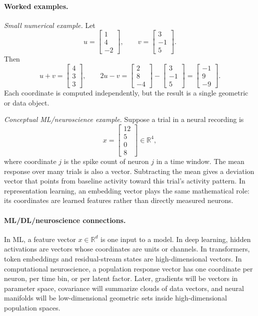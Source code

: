 \paragraph{Worked examples.}
\emph{Small numerical example.} Let
\[
u=\begin{bmatrix}1\\4\\-2\end{bmatrix},
\qquad
v=\begin{bmatrix}3\\-1\\5\end{bmatrix}.
\]
Then
\[
u+v=\begin{bmatrix}4\\3\\3\end{bmatrix},
\qquad
2u-v=
\begin{bmatrix}2\\8\\-4\end{bmatrix}
-
\begin{bmatrix}3\\-1\\5\end{bmatrix}
=
\begin{bmatrix}-1\\9\\-9\end{bmatrix}.
\]
Each coordinate is computed independently, but the result is a single geometric or data object.

\emph{Conceptual ML/neuroscience example.} Suppose a trial in a neural recording is
\[
x=\begin{bmatrix}12\\5\\0\\8\end{bmatrix}\in\mathbb{R}^4,
\]
where coordinate \(j\) is the spike count of neuron \(j\) in a time window. The mean response over many trials is also a vector. Subtracting the mean gives a deviation vector that points from baseline activity toward this trial's activity pattern. In representation learning, an embedding vector plays the same mathematical role: its coordinates are learned features rather than directly measured neurons.

\paragraph{ML/DL/neuroscience connections.}
In ML, a feature vector \(x\in\mathbb{R}^d\) is one input to a model. In deep learning, hidden activations are vectors whose coordinates are units or channels. In transformers, token embeddings and residual-stream states are high-dimensional vectors. In computational neuroscience, a population response vector has one coordinate per neuron, per time bin, or per latent factor. Later, gradients will be vectors in parameter space, covariance will summarize clouds of data vectors, and neural manifolds will be low-dimensional geometric sets inside high-dimensional population spaces.

